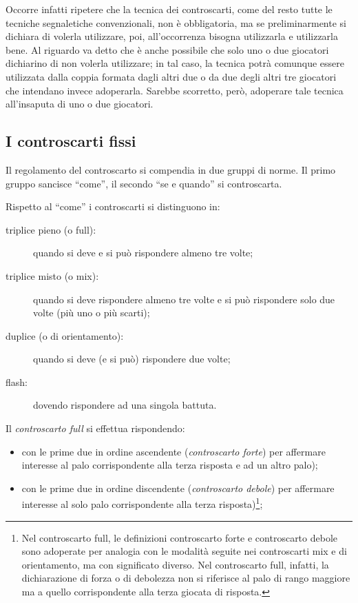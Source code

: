 \documentclass[italian,a4paper]{article}
\newenvironment{packeditem}{
\begin{itemize}
  \setlength{\itemsep}{1pt}
  \setlength{\parskip}{0pt}
  \setlength{\parsep}{0pt}
}{\end{itemize}}
\begin{document}
 Occorre infatti ripetere che la tecnica dei controscarti, come del resto tutte le tecniche segnaletiche convenzionali, non è obbligatoria, ma se preliminarmente si dichiara di volerla utilizzare, poi, all'occorrenza bisogna utilizzarla e utilizzarla bene. Al riguardo va detto che è anche possibile che solo uno o due giocatori dichiarino di non volerla utilizzare; in tal caso, la tecnica potrà comunque essere utilizzata dalla coppia formata dagli altri due o da due degli altri tre giocatori che intendano invece adoperarla.
Sarebbe scorretto, però, adoperare tale tecnica all'insaputa di uno o due giocatori.
 
\subsection{I controscarti fissi}
Il regolamento del controscarto si compendia in due gruppi di norme. Il primo gruppo sancisce ``come'', il secondo ``se e quando'' si controscarta.
 
Rispetto al ``come'' i controscarti si distinguono in:
\begin{description}
\item[triplice pieno (o full):] quando si deve e si può rispondere almeno tre volte;
\item[triplice misto (o mix):] quando si deve rispondere almeno tre volte e si può rispondere solo due volte (più uno o più scarti);
\item[duplice (o di orientamento):] quando si deve (e si può) rispondere due volte;
\item[flash:] dovendo rispondere ad una singola battuta.
\end{description}
 
 
Il \emph{controscarto full} si effettua rispondendo:
\begin{packeditem}
    \item con le prime due in ordine ascendente (\emph{controscarto forte}) per affermare interesse al palo corrispondente alla terza risposta e ad un altro palo);
    \item con le prime due in ordine discendente (\emph{controscarto
        debole}) per affermare interesse al solo palo corrispondente alla terza risposta)\footnote{Nel controscarto full, le definizioni controscarto forte e controscarto debole sono adoperate per analogia con le modalità seguite nei controscarti mix e di orientamento, ma con significato diverso. Nel controscarto full, infatti, la dichiarazione di forza o di debolezza non si riferisce al palo di rango maggiore ma a quello corrispondente alla terza giocata di risposta.};
\end{packeditem}
 
\end{document}
